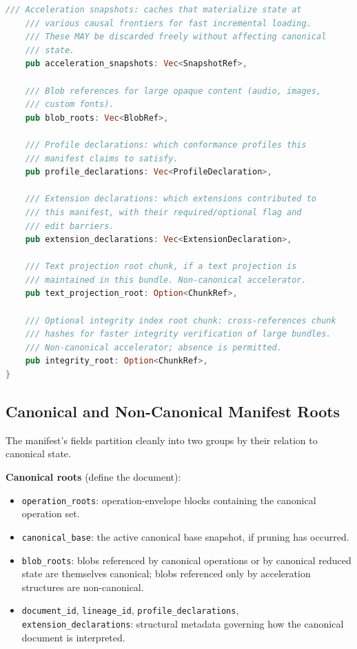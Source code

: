 \documentclass[11pt,letterpaper]{report}
\begin{document}
\begin{lstlisting}[language=Rust]
    /// Acceleration snapshots: caches that materialize state at
    /// various causal frontiers for fast incremental loading.
    /// These MAY be discarded freely without affecting canonical
    /// state.
    pub acceleration_snapshots: Vec<SnapshotRef>,

    /// Blob references for large opaque content (audio, images,
    /// custom fonts).
    pub blob_roots: Vec<BlobRef>,

    /// Profile declarations: which conformance profiles this
    /// manifest claims to satisfy.
    pub profile_declarations: Vec<ProfileDeclaration>,

    /// Extension declarations: which extensions contributed to
    /// this manifest, with their required/optional flag and
    /// edit barriers.
    pub extension_declarations: Vec<ExtensionDeclaration>,

    /// Text projection root chunk, if a text projection is
    /// maintained in this bundle. Non-canonical accelerator.
    pub text_projection_root: Option<ChunkRef>,

    /// Optional integrity index root chunk: cross-references chunk
    /// hashes for faster integrity verification of large bundles.
    /// Non-canonical accelerator; absence is permitted.
    pub integrity_root: Option<ChunkRef>,
}
\end{lstlisting}

\subsection{Canonical and Non-Canonical Manifest Roots}
\label{sec:format:roots}

The manifest's fields partition cleanly into two groups by their
relation to canonical state.

\textbf{Canonical roots} (define the document):

\begin{itemize}
  \item \texttt{operation\_roots}: operation-envelope blocks
    containing the canonical operation set.
  \item \texttt{canonical\_base}: the active canonical base
    snapshot, if pruning has occurred.
  \item \texttt{blob\_roots}: blobs referenced by canonical
    operations or by canonical reduced state are themselves
    canonical; blobs referenced only by acceleration structures
    are non-canonical.
  \item \texttt{document\_id}, \texttt{lineage\_id},
    \texttt{profile\_declarations},
    \texttt{extension\_declarations}: structural metadata
    governing how the canonical document is interpreted.
\end{itemize}
\end{document}
